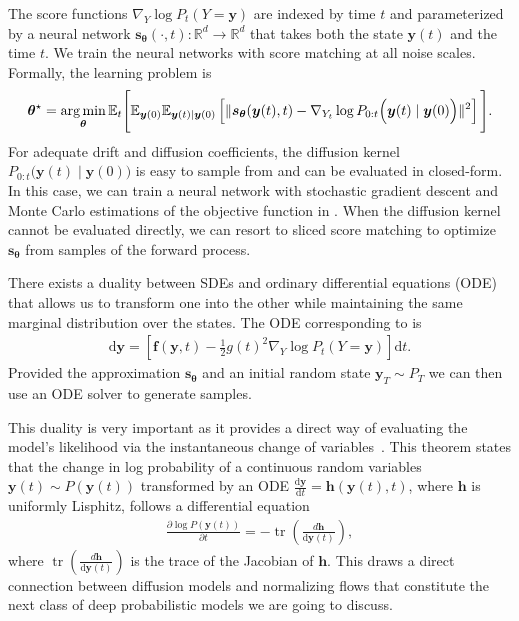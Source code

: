 The score functions $\nabla_Y \log P_t(Y=\bm{y})$ are indexed by time $t$ and parameterized by a neural network $\bm{s}_{\bm{\theta}}(\cdot, t) : \mathbb{R}^d \rightarrow \mathbb{R}^d$ that takes both the state $\bm{y}(t)$ and the time $t$. We train the neural networks with score matching at all noise scales. Formally, the learning problem is
\begin{align}
  \bm{\theta}^\star = \operatorname*{arg\,min}_{\bm{\theta}} \mathbb{E}_t\Bigg[ \mathbb{E}_{\bm{y}(0)} \mathbb{E}_{\bm{y}(t)\mid \bm{y}(0)}\left[ \lVert \bm{s}_{\bm{\theta}}(\bm{y}(t), t) - \nabla_{Y_t} \log P_{0:t}\Big(\bm{y}(t) \mid \bm{y}(0)\Big) \rVert^2 \right] \Bigg]. \label{eq:continuous_diffusion_objective}
\end{align}
For adequate drift and diffusion coefficients, the diffusion kernel $P_{0:t}\Big(\bm{y}(t) \mid \bm{y}(0)\Big)$ is easy to sample from and can be evaluated in closed-form. In this case, we can train a neural network with stochastic gradient descent and Monte Carlo estimations of the objective function in . When the diffusion kernel cannot be evaluated directly, we can resort to sliced score matching \citep{song2020sliced} to optimize $\bm{s}_{\bm{\theta }}$ from samples of the forward process.

There exists a duality between SDEs and ordinary differential equations (ODE) that allows us to transform one into the other while maintaining the same marginal distribution over the states. The ODE corresponding to  is
\begin{align}
  \text{d}\bm{y} = \left[ \bm{f}(\bm{y}, t) - \frac{1}{2}g(t)^2 \nabla_Y \log P_t(Y=\bm{y}) \right] \text{d}t.
\end{align}
Provided the approximation $\bm{s}_{\bm{\theta}}$ and an initial random state $\bm{y}_T \sim P_T$ we can then use an ODE solver to generate samples.

This duality is very important as it provides a direct way of evaluating the model's likelihood via the instantaneous change of variables~\citep{chen_neural_2018}. This theorem states that the change in log probability of a continuous random variables $\bm{y}(t) \sim P(\bm{y}(t))$ transformed by an ODE $\frac{\text{d}\bm{y}}{\text{d}t} = \bm{h}(\bm{y}(t), t)$, where $\bm{h}$ is uniformly Lisphitz, follows a differential equation
\begin{align}
  \frac{\partial \log P(\bm{y}(t))}{\partial t} = -\operatorname{tr}(\frac{d\bm{h}}{\text{d}\bm{y}(t)}), \label{eq:NODE_NF}
\end{align}
where $\operatorname{tr}(\frac{d\bm{h}}{\text{d}\bm{y}(t)})$ is the trace of the Jacobian of $\bm{h}$. This draws a direct connection between diffusion models and normalizing flows that constitute the next class of deep probabilistic models we are going to discuss.

